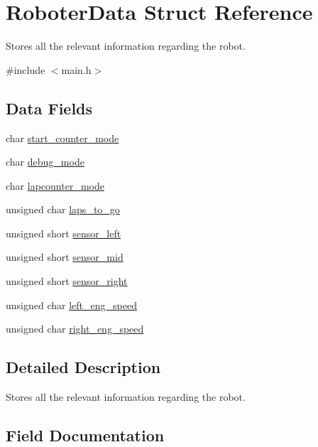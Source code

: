 \hypertarget{structRoboterData}{}\section{Roboter\+Data Struct Reference}
\label{structRoboterData}


Stores all the relevant information regarding the robot.  




{\ttfamily \#include $<$main.\+h$>$}

\subsection*{Data Fields}
\begin{DoxyCompactItemize}
\item 
char \hyperlink{structRoboterData_a6f099c13b46eab50678aec438cc53ca3}{start\+\_\+counter\+\_\+mode}
\item 
char \hyperlink{structRoboterData_ace2f158d5f68533ef246dd213a29bd9f}{debug\+\_\+mode}
\item 
char \hyperlink{structRoboterData_a6430a29ef767a960096d41388d0bf4fe}{lapcounter\+\_\+mode}
\item 
unsigned char \hyperlink{structRoboterData_acd766b4055de6019017cd677dd6d50e7}{laps\+\_\+to\+\_\+go}
\item 
unsigned short \hyperlink{structRoboterData_a9545c958467511381caa09f9735d75ae}{sensor\+\_\+left}
\item 
unsigned short \hyperlink{structRoboterData_a6cf40606f9d548200547cac093ed2757}{sensor\+\_\+mid}
\item 
unsigned short \hyperlink{structRoboterData_a020fa812afb0119b21c9e242ce47fd79}{sensor\+\_\+right}
\item 
unsigned char \hyperlink{structRoboterData_a36c0359086a8902cbbc7da8e56f2c35f}{left\+\_\+eng\+\_\+speed}
\item 
unsigned char \hyperlink{structRoboterData_aafcb7569d083d3417ab734aa787fff79}{right\+\_\+eng\+\_\+speed}
\end{DoxyCompactItemize}


\subsection{Detailed Description}
Stores all the relevant information regarding the robot. 

\subsection{Field Documentation}
\mbox{\label{structRoboterData_ace2f158d5f68533ef246dd213a29bd9f}} 
